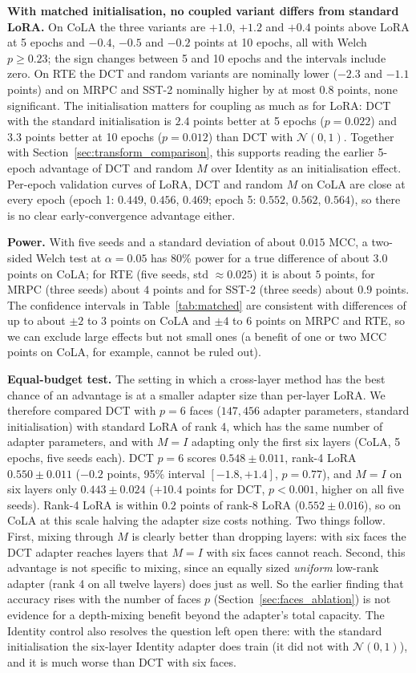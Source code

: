 \documentclass{article}
\theoremstyle{plain}
\begin{document}
\noindent
\textbf{With matched initialisation, no coupled variant differs from standard LoRA.}
On CoLA the three variants are $+1.0$, $+1.2$ and $+0.4$ points above LoRA at 5 epochs and $-0.4$, $-0.5$ and $-0.2$ points at 10 epochs, all with Welch $p\ge0.23$;
the sign changes between 5 and 10 epochs and the intervals include zero.
On RTE the DCT and random variants are nominally lower ($-2.3$ and $-1.1$ points) and on MRPC and SST-2 nominally higher by at most $0.8$ points, none significant.
The initialisation matters for coupling as much as for LoRA: DCT with the standard initialisation is $2.4$ points better at 5 epochs ($p=0.022$) and $3.3$ points better at 10 epochs ($p=0.012$) than DCT with $\mathcal{N}(0,1)$.
Together with Section~\ref{sec:transform_comparison}, this supports reading the earlier 5-epoch advantage of DCT and random $M$ over Identity as an initialisation effect.
Per-epoch validation curves of LoRA, DCT and random $M$ on CoLA are close at every epoch (epoch 1: $0.449$, $0.456$, $0.469$; epoch 5: $0.552$, $0.562$, $0.564$), so there is no clear early-convergence advantage either.

\textbf{Power.}
With five seeds and a standard deviation of about $0.015$ MCC, a two-sided Welch test at $\alpha=0.05$ has 80\% power for a true difference of about $3.0$ points on CoLA; for RTE (five seeds, std $\approx0.025$) it is about $5$ points, for MRPC (three seeds) about $4$ points and for SST-2 (three seeds) about $0.9$ points.
The confidence intervals in Table~\ref{tab:matched} are consistent with differences of up to about $\pm2$ to $3$ points on CoLA and $\pm4$ to $6$ points on MRPC and RTE, so we can exclude large effects but not
small ones (a benefit of one or two MCC points on CoLA, for example, cannot be ruled out).

\textbf{Equal-budget test.}
The setting in which a cross-layer method has the best chance of an advantage is at a smaller adapter size than per-layer LoRA.
We therefore compared DCT with $p=6$ faces ($147{,}456$ adapter parameters, standard initialisation) with standard LoRA of rank 4, which has the same number of adapter parameters,
and with $M=I$ adapting only the first six layers (CoLA, 5 epochs, five seeds each).
DCT $p=6$ scores $0.548\pm0.011$, rank-4 LoRA $0.550\pm0.011$ ($-0.2$ points, 95\% interval $[-1.8,+1.4]$, $p=0.77$), and $M=I$ on six layers only $0.443\pm0.024$ ($+10.4$ points for DCT, $p<0.001$, higher on all five seeds).
Rank-4 LoRA is within $0.2$ points of rank-8 LoRA ($0.552\pm0.016$), so on CoLA at this scale halving the adapter size costs nothing.
Two things follow.
First, mixing through $M$ is clearly better than dropping layers: with six faces the DCT adapter reaches layers that $M=I$ with six faces cannot reach.
Second, this advantage is not specific to mixing, since an equally sized \emph{uniform} low-rank adapter (rank 4 on all twelve layers) does just as well.
So the earlier finding that accuracy rises with the number of faces $p$ (Section~\ref{sec:faces_ablation}) is not evidence for a depth-mixing benefit beyond the adapter's total capacity.
The Identity control also resolves the question left open there: with the standard initialisation the six-layer Identity adapter does train (it did not with $\mathcal{N}(0,1)$), and it is much worse than DCT with six faces.
\end{document}

